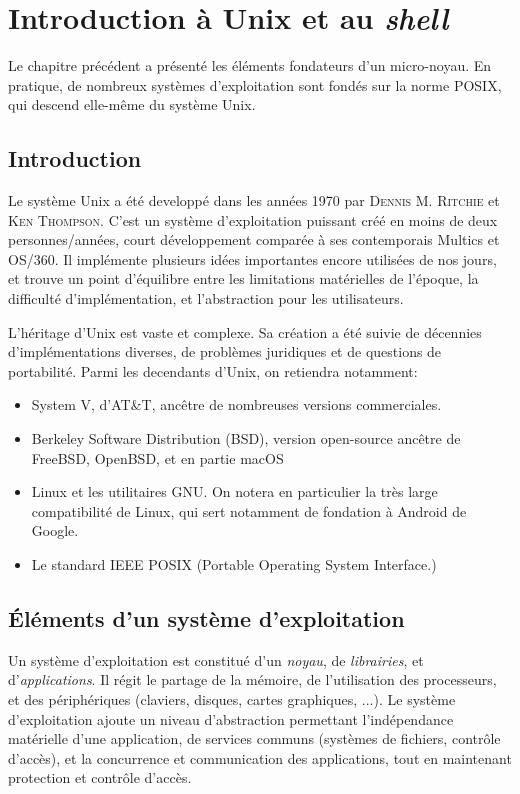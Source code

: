 \documentclass[french, toc]{../cs-classes/cs-classes}
\begin{document}
\section{Introduction à Unix et au \emph{shell}}
Le chapitre précédent a présenté les éléments fondateurs d'un micro-noyau. En pratique, de nombreux systèmes d'exploitation sont fondés sur la norme POSIX, qui descend elle-même du système Unix.

\subsection{Introduction}
Le système Unix a été developpé dans les années 1970 par \textsc{Dennis M. Ritchie} et \textsc{Ken Thompson}. C'est un système d'exploitation puissant créé en moins de deux personnes/années, court développement comparée à ses contemporais Multics et OS/360. Il implémente plusieurs idées importantes encore utilisées de nos jours, et trouve un point d'équilibre entre les limitations matérielles de l'époque, la difficulté d'implémentation, et l'abstraction pour les utilisateurs.

L'héritage d'Unix est vaste et complexe. Sa création a été suivie de décennies d'implémentations diverses, de problèmes juridiques et de questions de portabilité. Parmi les decendants d'Unix, on retiendra notamment:
\begin{itemize}
    \item System V, d'AT\&T, ancêtre de nombreuses versions commerciales.
    \item Berkeley Software Distribution (BSD), version open-source ancêtre de FreeBSD, OpenBSD, et en partie macOS
    \item Linux et les utilitaires GNU. On notera en particulier la très large compatibilité de Linux, qui sert notamment de fondation à Android de Google.
    \item Le standard IEEE POSIX (Portable Operating System Interface.)
\end{itemize}

\subsection{Éléments d'un système d'exploitation}
Un système d'exploitation est constitué d'un \emph{noyau}, de \emph{librairies}, et d'\emph{applications}. Il régit le partage de la mémoire, de l'utilisation des processeurs, et des périphériques (claviers, disques, cartes graphiques, ...). Le système d'exploitation ajoute un niveau d'abstraction permettant l'indépendance matérielle d'une application, de services communs (systèmes de fichiers, contrôle d'accès), et la concurrence et communication des applications, tout en maintenant protection et contrôle d'accès.
\end{document}
